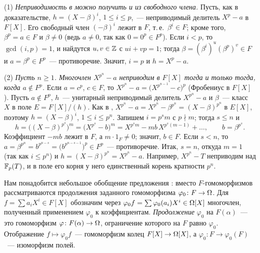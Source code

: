 \begin{remark}[2.3a]
(1) \emph{Неприводимость в  можно получить и из свободного члена.} Пусть, как в доказательстве, $h=(X-\beta)^i$,
$1\le i\le p$,~--- неприводимый делитель $X^p-a$ в $F[X]$. Его свободный член $(-\beta)^i$ лежит в $F$, т.\,е.\
$\beta^i\in F$; кроме того, $\beta^p=a\in F$ и $\beta\ne0$ (ведь $a\ne0$, так как $0=0^p\in F^p$). Если $i<p$, то
$\gcd(i,p)=1$, и найдутся $u,v\in\mathbb Z$ с $ui+vp=1$; тогда $\beta=(\beta^i)^u(\beta^p)^v\in F$ и $a=\beta^p\in F^p$~---
противоречие. Значит, $i=p$ и $h=X^p-a$.

(2) \emph{Пусть $n\ge1$. Многочлен $X^{p^n}-a$ неприводим в $F[X]$ тогда и только тогда, когда $a\notin F^p$.} Если
$a=c^p$, $c\in F$, то $X^{p^n}-a=\bigl(X^{p^{n-1}}-c\bigr)^p$ (Фробениус в $F[X]$). Пусть $a\notin F^p$, $h$~--- унитарный
неприводимый делитель $X^{p^n}-a$ и $\beta$~--- класс $X$ в поле $E=F[X]/(h)$. Как в \rf{2.3},
$X^{p^n}-a=X^{p^n}-\beta^{p^n}=(X-\beta)^{p^n}$ в $E[X]$, поэтому $h=(X-\beta)^i$, $1\le i\le p^n$. Запишем $i=p^sm$ с
$p\nmid m$; тогда $s\le n$ и
\[
h=\bigl((X-\beta)^{p^s}\bigr)^m=\bigl(X^{p^s}-b\bigr)^m=X^{p^sm}-mb\,X^{p^s(m-1)}+\dots,\qquad b=\beta^{p^s}.
\]
Коэффициент $-mb$ лежит в $F$, а $m\cdot1_F\ne0$; значит, $b\in F$. Если $s<n$, то
$a=\beta^{p^n}=b^{p^{n-s}}=\bigl(b^{p^{n-s-1}}\bigr)^p\in F^p$~--- противоречие. Итак, $s=n$, откуда $m=1$ (так как $i\le p^n$) и
$h=(X-\beta)^{p^n}=X^{p^n}-a$. Например, $X^{p^n}-T$ неприводим над $\mathbb F_p(T)$, и в поле его корня у него единственный корень
кратности $p^n$.
\end{remark}

Нам понадобится небольшое обобщение предложения : вместо $F$-гомоморфизмов рассматриваются продолжения
заданного гомоморфизма $\varphi_0\colon F\to\Omega$. Для $f=\sum a_iX^i\in F[X]$ обозначим через $\varphi_0f=\sum\varphi_0(a_i)X^i\in\Omega[X]$
многочлен, полученный применением $\varphi_0$ к коэффициентам. \emph{Продолжение} $\varphi_0$ на $F(\alpha)$~--- это
гомоморфизм $\varphi\colon F(\alpha)\to\Omega$, ограничение которого на $F$ равно $\varphi_0$. Отображение $f\mapsto\varphi_0f$~---
гомоморфизм колец $F[X]\to\Omega[X]$, а $\varphi_0\colon F\to\varphi_0(F)$~--- изоморфизм полей.

